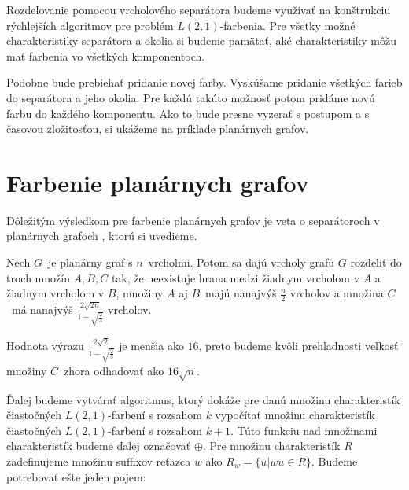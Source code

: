 Rozdeľovanie pomocou vrcholového separátora budeme využívať na konštrukciu rýchlejších algoritmov
pre problém $L(2,1)$-farbenia. Pre všetky možné charakteristiky separátora a okolia si budeme pamätať,
aké charakteristiky môžu mať farbenia vo všetkých komponentoch.

Podobne bude prebiehať pridanie novej
farby. Vyskúšame pridanie všetkých farieb do separátora a jeho okolia. Pre každú takúto možnosť potom
pridáme novú farbu do každého komponentu. Ako to bude presne vyzerať s postupom a s časovou zložitosťou,
si ukážeme na príklade planárnych grafov.

\section{Farbenie planárnych grafov}

Dôležitým výsledkom pre farbenie planárnych grafov je veta o separátoroch v planárnych grafoch \cite{tarjan_plansep},
ktorú si uvedieme.

\begin{veta}
    \label{planarsep-veta}
    Nech $G$ je planárny graf s $n$ vrcholmi. Potom sa dajú vrcholy grafu $G$ rozdeliť do troch množín $A, B, C$ tak,
    že neexistuje hrana medzi žiadnym vrcholom v $A$ a žiadnym vrcholom v $B$, množiny $A$ aj $B$ majú nanajvýš $\frac{n}{2}$
    vrcholov a množina $C$ má nanajvýš $\frac{2 \sqrt{2n}}{1 - \sqrt{\frac{2}{3}}}$ vrcholov.
\end{veta}

\begin{pozn}
Hodnota výrazu $\frac{2 \sqrt{2}}{1 - \sqrt{\frac{2}{3}}}$ je menšia ako $16$, preto budeme kvôli prehľadnosti
veľkosť množiny $C$ zhora odhadovať ako $16 \sqrt{n}$.
\end{pozn}

Ďalej budeme vytvárať algoritmus, ktorý dokáže pre danú množinu charakteristík čiastočných $L(2,1)$-farbení
s rozsahom $k$ vypočítať množinu charakteristík čiastočných $L(2,1)$-farbení s rozsahom $k+1$. Túto funkciu
nad množinami charakteristík budeme ďalej označovať $\oplus$. Pre množinu charakteristík $R$ zadefinujeme
množinu suffixov reťazca $w$ ako $R_w = \{u | wu \in R \}$. Budeme potrebovať ešte jeden pojem:

